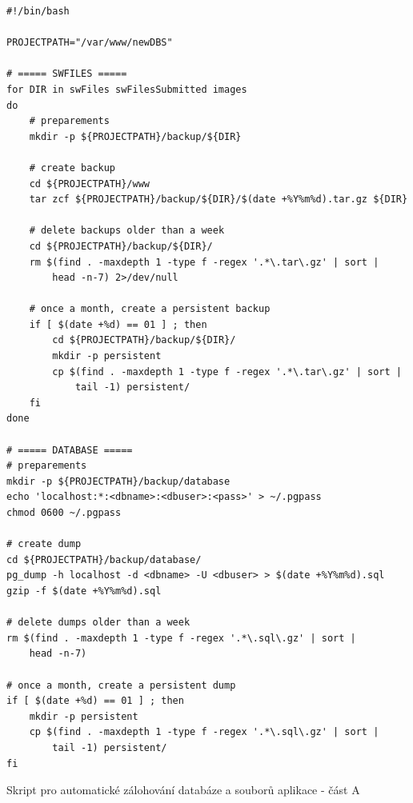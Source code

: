 \begin{listing}[H]
	\begin{verbatim}
#!/bin/bash

PROJECTPATH="/var/www/newDBS"

# ===== SWFILES =====
for DIR in swFiles swFilesSubmitted images
do
    # preparements
    mkdir -p ${PROJECTPATH}/backup/${DIR}

    # create backup
    cd ${PROJECTPATH}/www
    tar zcf ${PROJECTPATH}/backup/${DIR}/$(date +%Y%m%d).tar.gz ${DIR}

    # delete backups older than a week
    cd ${PROJECTPATH}/backup/${DIR}/
    rm $(find . -maxdepth 1 -type f -regex '.*\.tar\.gz' | sort |
        head -n-7) 2>/dev/null

    # once a month, create a persistent backup
    if [ $(date +%d) == 01 ] ; then
        cd ${PROJECTPATH}/backup/${DIR}/
        mkdir -p persistent
        cp $(find . -maxdepth 1 -type f -regex '.*\.tar\.gz' | sort |
            tail -1) persistent/
    fi
done

# ===== DATABASE =====
# preparements
mkdir -p ${PROJECTPATH}/backup/database
echo 'localhost:*:<dbname>:<dbuser>:<pass>' > ~/.pgpass
chmod 0600 ~/.pgpass

# create dump
cd ${PROJECTPATH}/backup/database/
pg_dump -h localhost -d <dbname> -U <dbuser> > $(date +%Y%m%d).sql
gzip -f $(date +%Y%m%d).sql

# delete dumps older than a week
rm $(find . -maxdepth 1 -type f -regex '.*\.sql\.gz' | sort |
    head -n-7)

# once a month, create a persistent dump
if [ $(date +%d) == 01 ] ; then
    mkdir -p persistent
    cp $(find . -maxdepth 1 -type f -regex '.*\.sql\.gz' | sort |
        tail -1) persistent/
fi
	\end{verbatim}
	\caption{Skript pro automatické zálohování databáze a souborů aplikace - část A} \label{code:backup-a}
\end{listing}
